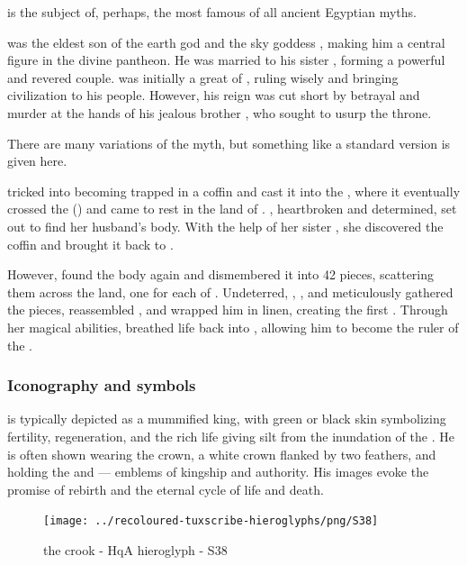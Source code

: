  is the subject of, perhaps, the most famous of all ancient Egyptian myths.

 was the eldest son of the earth god  and the sky goddess , making him a central figure in the divine pantheon. He was married to his sister , forming a powerful and revered couple.  was initially a great  of , ruling wisely and bringing civilization to his people. However, his reign was cut short by betrayal and murder at the hands of his jealous brother , who sought to usurp the throne.

There are many variations of the myth, but something like a standard version is given here.

 tricked  into becoming trapped in a coffin and cast it into the , where it eventually crossed the  () and came to rest in the land of . , heartbroken and determined, set out to find her husband's body. With the help of her sister , she discovered the coffin and brought it back to .

However,  found the body again and dismembered it into 42 pieces, scattering them across the land, one for each  of . Undeterred, , , and  meticulously gathered the pieces, reassembled , and wrapped him in linen, creating the first . Through her magical abilities,  breathed life back into , allowing him to become the ruler of the .

\subsubsection*{Iconography and symbols}

 is typically depicted as a mummified king, with green or black skin symbolizing fertility, regeneration, and the rich life giving silt from the inundation of the . He is often shown wearing the  crown, a white crown flanked by two  feathers, and holding the  and  — emblems of kingship and authority. His images evoke the promise of rebirth and the eternal cycle of life and death.

\begin{figure} [H]
	\centering
	\texttt{[image: ../recoloured-tuxscribe-hieroglyphs/png/S38]}
	\caption{the crook - HqA hieroglyph - S38}
\end{figure}

